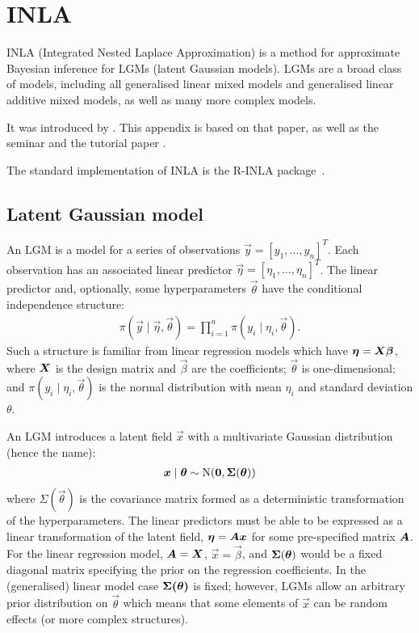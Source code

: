 \documentclass[thesis.tex]{subfiles}
\begin{document}
\chapter{INLA} \label{transmission:sec:INLA}


INLA (Integrated Nested Laplace Approximation) is a method for approximate Bayesian inference for LGMs (latent Gaussian models).
LGMs are a broad class of models, including all generalised linear mixed models and generalised linear additive mixed models, as well as many more complex models.

It was introduced by \textcite{rueINLA}.
This appendix is based on that paper, as well as the seminar \textcite{rueINLAseminar} and the tutorial paper \textcite{martinoINLAtutorial}.

The standard implementation of INLA is the R-INLA package~\autocite{RINLA}.

\section{Latent Gaussian model}

An LGM is a model for a series of observations $\vec{y} = [y_1, \dots, y_n]^T$.
Each observation has an associated linear predictor $\vec{\eta} = [\eta_1, \dots, \eta_n]^T$.
The linear predictor and, optionally, some hyperparameters $\vec{\theta}$ have the conditional independence structure:
\begin{align}
    \pi(\vec{y} \mid \vec{\eta}, \vec{\theta}) = \prod_{i=1}^n \pi(y_i \mid \eta_i, \vec{\theta}).
\end{align}
Such a structure is familiar from linear regression models which have $\bm{\eta} = \bm{X} \bm{\beta}$, where $\bm{X}$ is the design matrix and $\vec{\beta}$ are the coefficients; $\vec{\theta}$ is one-dimensional; and $\pi(y_i \mid \eta_i, \vec{\theta})$ is the normal distribution with mean $\eta_i$ and standard deviation $\theta$.

An LGM introduces a latent field $\vec{x}$ with a multivariate Gaussian distribution (hence the name):
\begin{align}
    \bm{x} \mid \bm{\theta} \sim \operatorname{N}(\bm{0}, \bm{\Sigma}(\bm{\theta}))
\end{align}
where $\Sigma(\vec{\theta})$ is the covariance matrix formed as a deterministic transformation of the hyperparameters.
The linear predictors must be able to be expressed as a linear transformation of the latent field, \ie $\bm{\eta} = \bm{A} \bm{x}$ for some pre-specified matrix $\bm{A}$.
For the linear regression model, $\bm{A} = \bm{X}$, $\vec{x} = \vec{\beta}$, and $\bm{\Sigma}(\bm{\theta})$ would be a fixed diagonal matrix specifying the prior on the regression coefficients.
In the (generalised) linear model case $\bm{\Sigma(\bm{\theta})}$ is fixed; however, LGMs allow an arbitrary prior distribution on $\vec{\theta}$ which means that some elements of $\vec{x}$ can be random effects (or more complex structures).
\end{document}
